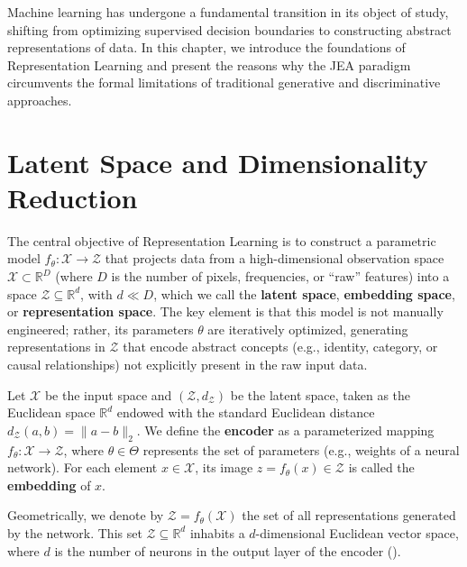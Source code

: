 \documentclass[11pt, oneside, openany]{book}
\begin{document}
Machine learning has undergone a fundamental transition in its object of study, shifting from optimizing supervised decision boundaries to constructing abstract representations of data. In this chapter, we introduce the foundations of Representation Learning and present the reasons why the JEA paradigm circumvents the formal limitations of traditional generative and discriminative approaches.

\section{Latent Space and Dimensionality Reduction}
\label{sec:1.1}

The central objective of Representation Learning is to construct a parametric model $f_{\theta} \colon \mathcal{X} \to \mathcal{Z}$ that projects data from a high-dimensional observation space $\mathcal{X} \subset \mathbb{R}^{D}$ (where $D$ is the number of pixels, frequencies, or ``raw'' features) into a space $\mathcal{Z} \subseteq \mathbb{R}^{d}$, with $d \ll D$, which we call the \textbf{latent space}, \textbf{embedding space}, or \textbf{representation space}. The key element is that this model is not manually engineered; rather, its parameters $\theta$ are iteratively optimized, generating representations in $\mathcal{Z}$ that encode abstract concepts (e.g., identity, category, or causal relationships) not explicitly present in the raw input data.

\begin{definition}
\label{def:1.1}
Let $\mathcal{X}$ be the input space and $(\mathcal{Z}, d_{\mathcal{Z}})$ be the latent space, taken as the Euclidean space $\mathbb{R}^{d}$ endowed with the standard Euclidean distance $d_{\mathcal{Z}}(a,b) = \lVert a - b \rVert_{2}$. We define the \textbf{encoder} as a parameterized mapping $f_{\theta} \colon \mathcal{X} \to \mathcal{Z}$, where $\theta \in \Theta$ represents the set of parameters (e.g., weights of a neural network). For each element $x \in \mathcal{X}$, its image $z = f_{\theta}(x) \in \mathcal{Z}$ is called the \textbf{embedding} of $x$.
\end{definition}

Geometrically, we denote by $\mathcal{Z} = f_{\theta}(\mathcal{X})$ the set of all representations generated by the network. This set $\mathcal{Z} \subseteq \mathbb{R}^{d}$ inhabits a $d$-dimensional Euclidean vector space, where $d$ is the number of neurons in the output layer of the encoder ().
\end{document}
